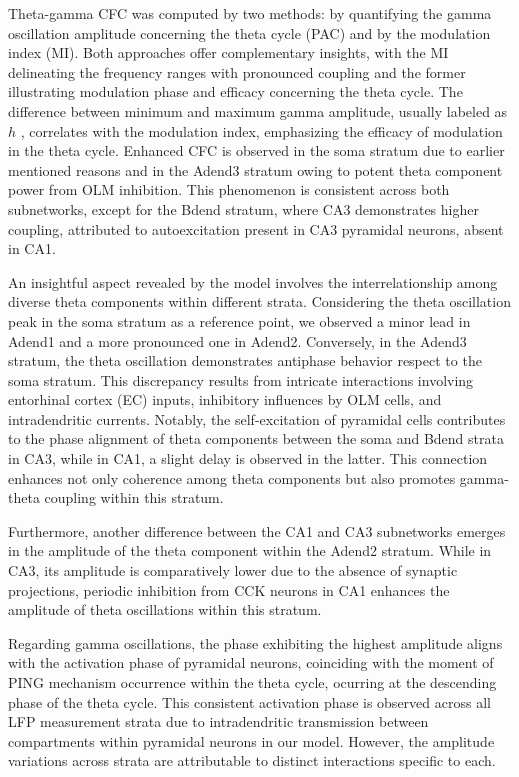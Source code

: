 \documentclass[../main.tex]{subfiles}
\begin{document}
Theta-gamma CFC was computed by two methods: by quantifying the gamma oscillation amplitude concerning the theta cycle (PAC) and by the modulation index (MI). 
Both approaches offer complementary insights, with the MI delineating the frequency ranges with pronounced coupling and the former illustrating modulation phase and efficacy concerning the theta cycle.
The difference between minimum and maximum gamma amplitude, usually labeled as $h$ \citep{kramer2016case}, correlates with the modulation index, emphasizing the efficacy of modulation in the theta cycle.
Enhanced CFC is observed in the soma stratum due to earlier mentioned reasons and in the Adend3 stratum owing to potent theta component power from OLM inhibition.
This phenomenon is consistent across both subnetworks, except for the Bdend stratum, where CA3 demonstrates higher coupling, attributed to autoexcitation present in CA3 pyramidal neurons, absent in CA1.

An insightful aspect revealed by the model involves the interrelationship among diverse theta components within different strata.
Considering the theta oscillation peak in the soma stratum as a reference point, we observed a minor lead in Adend1 and a more pronounced one in Adend2.
Conversely, in the Adend3 stratum, the theta oscillation demonstrates antiphase behavior respect to the soma stratum.
This discrepancy results from intricate interactions involving entorhinal cortex (EC) inputs, inhibitory influences by OLM cells, and intradendritic currents.
Notably, the self-excitation of pyramidal cells contributes to the phase alignment of theta components between the soma and Bdend strata in CA3, while in CA1, a slight delay is observed in the latter.
This connection enhances not only coherence among theta components but also promotes gamma-theta coupling within this stratum.

Furthermore, another difference between the CA1 and CA3 subnetworks emerges in the amplitude of the theta component within the Adend2 stratum.
While in CA3, its amplitude is comparatively lower due to the absence of synaptic projections, periodic inhibition from CCK neurons in CA1 enhances the amplitude of theta oscillations within this stratum.

Regarding gamma oscillations, the phase exhibiting the highest amplitude aligns with the activation phase of pyramidal neurons, coinciding with the moment of PING mechanism occurrence within the theta cycle, ocurring at the descending phase of the theta cycle.
This consistent activation phase is observed across all LFP measurement strata due to intradendritic transmission between compartments within pyramidal neurons in our model.
However, the amplitude variations across strata are attributable to distinct interactions specific to each.
\end{document}
